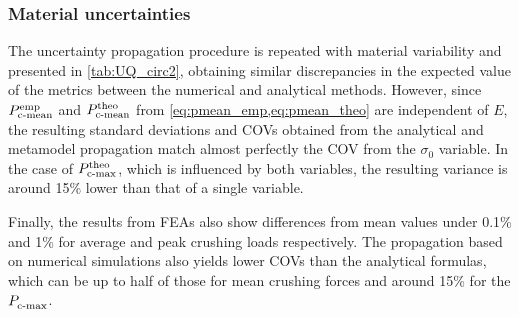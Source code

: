 \documentclass[12pt,number,preprint,review,times]{elsarticle}
\begin{document}
\subsubsection{Material uncertainties}

The uncertainty propagation procedure is repeated with material variability and presented in \cref{tab:UQ_circ2}, obtaining similar discrepancies in the expected value of the metrics between the numerical and analytical methods. However, since  $P^{\mathrm{emp}}_{\mathrm{c{\text -}mean}}$ and  $P^{\mathrm{theo}}_{\mathrm{c{\text -}mean}}$ from \cref{eq:pmean_emp,eq:pmean_theo} are independent of $E$, the resulting standard deviations and COVs obtained from the analytical and metamodel propagation match almost perfectly the COV from the $\sigma_0$ variable. In the case of $P^{\mathrm{theo}}_{\mathrm{c{\text -}max}}$, which is influenced by both variables, the resulting variance is around 15\% lower than that of a single variable. 

Finally, the results from FEAs also show differences from mean values under 0.1\% and 1\% for average and peak crushing loads respectively. The propagation based on numerical simulations also yields lower COVs than the analytical formulas, which can be up to half of those for mean crushing forces and around 15\% for the $P^{\mathrm{}}_{\mathrm{c{\text -}max}}$.

\end{document}
